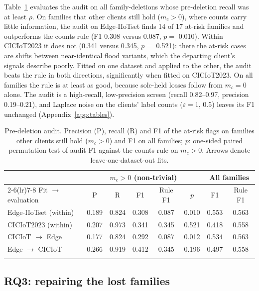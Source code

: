 \documentclass[pdflatex,sn-mathphys-num,iicol]{sn-jnl}
\begin{document}
Table~\ref{tab:audit} evaluates the audit on all family-deletions whose pre-deletion recall was at least $\rho$. On families that other clients still hold ($m_c>0$), where counts carry little information, the audit on Edge-IIoTset finds 14 of 17 at-risk families and outperforms the counts rule (F1 0.308 versus 0.087, $p=$ 0.010). Within CICIoT2023 it does not (0.341 versus 0.345, $p=$ 0.521): there the at-risk cases are shifts between near-identical flood variants, which the departing client's signals describe poorly. Fitted on one dataset and applied to the other, the audit beats the rule in both directions, significantly when fitted on CICIoT2023. On all families the rule is at least as good, because sole-held losses follow from $m_c=0$ alone. The audit is a high-recall, low-precision screen (recall 0.82--0.97, precision 0.19--0.21), and Laplace noise on the clients' label counts ($\varepsilon=1$, $0.5$) leaves its F1 unchanged (Appendix~\ref{app:tables}).

\begin{table}[t]
\caption{Pre-deletion audit. Precision (P), recall (R) and F1 of the at-risk flags on families other clients still hold ($m_c>0$) and F1 on all families; $p$: one-sided paired permutation test of audit F1 against the counts rule on $m_c>0$. Arrows denote leave-one-dataset-out fits.}\label{tab:audit}
\scriptsize
\setlength{\tabcolsep}{3pt}
\begin{tabular*}{\textwidth}{@{\extracolsep\fill}lccccccc}
\toprule
 & \multicolumn{5}{c}{$m_c>0$ (non-trivial)} & \multicolumn{2}{c}{All families} \\
\cmidrule(lr){2-6}\cmidrule(lr){7-8}
Fit $\rightarrow$ evaluation & P & R & F1 & Rule F1 & $p$ & F1 & Rule F1 \\
\midrule
Edge-IIoTset (within) & 0.189 & 0.824 & 0.308 & 0.087 & 0.010 & 0.553 & 0.563 \\
CICIoT2023 (within) & 0.207 & 0.973 & 0.341 & 0.345 & 0.521 & 0.418 & 0.558 \\
CICIoT $\rightarrow$ Edge & 0.177 & 0.824 & 0.292 & 0.087 & 0.012 & 0.534 & 0.563 \\
Edge $\rightarrow$ CICIoT & 0.266 & 0.919 & 0.412 & 0.345 & 0.196 & 0.497 & 0.558 \\
\botrule
\end{tabular*}
\end{table}

\subsection{RQ3: repairing the lost families}\label{sec:res-rq3}
\end{document}
